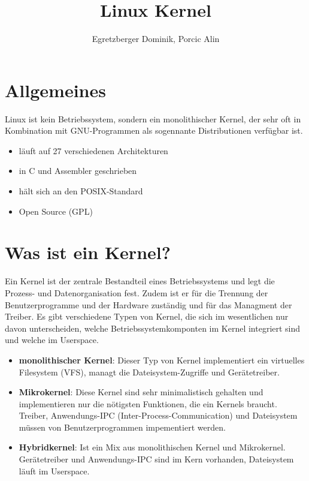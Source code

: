 \documentclass[a4paper]{article}
\title{Linux Kernel}
\author{Egretzberger Dominik, Porcic Alin}
\begin{document}
\maketitle
\newpage

\tableofcontents
\newpage

\section{Allgemeines}

Linux ist kein Betriebssystem, sondern ein monolithischer Kernel, der sehr oft in Kombination mit GNU-Programmen als sogennante Distributionen verfügbar ist.

\begin{itemize}
\item läuft auf 27 verschiedenen Architekturen
\item in C und Assembler geschrieben
\item hält sich an den POSIX-Standard
\item Open Source (GPL)
\end{itemize}

\section{Was ist ein Kernel?}

Ein Kernel ist der zentrale Bestandteil eines Betriebssystems und legt die Prozess- und Datenorganisation fest. Zudem ist er für die Trennung der Benutzerprogramme und der Hardware zuständig und für das Managment der Treiber. Es gibt verschiedene Typen von Kernel, die sich im wesentlichen nur davon unterscheiden, welche Betriebssystemkomponten im Kernel integriert sind und welche im Userspace.

\begin{itemize}
\item \textbf{monolithischer Kernel}: Dieser Typ von Kernel implementiert ein virtuelles Filesystem (VFS), managt die Dateisystem-Zugriffe und Gerätetreiber.
\item \textbf{Mikrokernel}: Diese Kernel sind sehr minimalistisch gehalten und implementieren nur die nötigsten Funktionen, die ein Kernels braucht. Treiber, Anwendungs-IPC (Inter-Process-Communication) und Dateisystem müssen von Benutzerprogrammen impementiert werden.
\item \textbf{Hybridkernel}: Ist ein Mix aus monolithischen Kernel und Mikrokernel. Gerätetreiber und Anwendungs-IPC sind im Kern vorhanden, Dateisystem läuft im Userspace.
\end{itemize}
\end{document}
